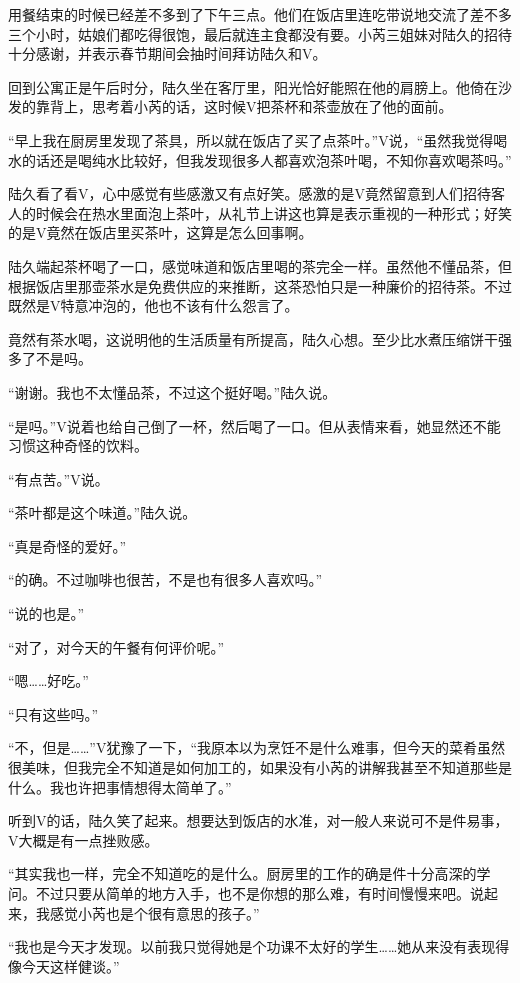 用餐结束的时候已经差不多到了下午三点。他们在饭店里连吃带说地交流了差不多三个小时，姑娘们都吃得很饱，最后就连主食都没有要。小芮三姐妹对陆久的招待十分感谢，并表示春节期间会抽时间拜访陆久和V。

回到公寓正是午后时分，陆久坐在客厅里，阳光恰好能照在他的肩膀上。他倚在沙发的靠背上，思考着小芮的话，这时候V把茶杯和茶壶放在了他的面前。

“早上我在厨房里发现了茶具，所以就在饭店了买了点茶叶。”V说，“虽然我觉得喝水的话还是喝纯水比较好，但我发现很多人都喜欢泡茶叶喝，不知你喜欢喝茶吗。”

陆久看了看V，心中感觉有些感激又有点好笑。感激的是V竟然留意到人们招待客人的时候会在热水里面泡上茶叶，从礼节上讲这也算是表示重视的一种形式；好笑的是V竟然在饭店里买茶叶，这算是怎么回事啊。

陆久端起茶杯喝了一口，感觉味道和饭店里喝的茶完全一样。虽然他不懂品茶，但根据饭店里那壶茶水是免费供应的来推断，这茶恐怕只是一种廉价的招待茶。不过既然是V特意冲泡的，他也不该有什么怨言了。

竟然有茶水喝，这说明他的生活质量有所提高，陆久心想。至少比水煮压缩饼干强多了不是吗。

“谢谢。我也不太懂品茶，不过这个挺好喝。”陆久说。

“是吗。”V说着也给自己倒了一杯，然后喝了一口。但从表情来看，她显然还不能习惯这种奇怪的饮料。

“有点苦。”V说。

“茶叶都是这个味道。”陆久说。

“真是奇怪的爱好。”

“的确。不过咖啡也很苦，不是也有很多人喜欢吗。”

“说的也是。”

“对了，对今天的午餐有何评价呢。”

“嗯……好吃。”

“只有这些吗。”

“不，但是……”V犹豫了一下，“我原本以为烹饪不是什么难事，但今天的菜肴虽然很美味，但我完全不知道是如何加工的，如果没有小芮的讲解我甚至不知道那些是什么。我也许把事情想得太简单了。”

听到V的话，陆久笑了起来。想要达到饭店的水准，对一般人来说可不是件易事，V大概是有一点挫败感。

“其实我也一样，完全不知道吃的是什么。厨房里的工作的确是件十分高深的学问。不过只要从简单的地方入手，也不是你想的那么难，有时间慢慢来吧。说起来，我感觉小芮也是个很有意思的孩子。”

“我也是今天才发现。以前我只觉得她是个功课不太好的学生……她从来没有表现得像今天这样健谈。”

